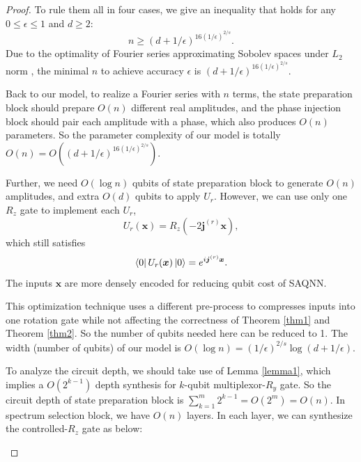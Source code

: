 \documentclass{article}
\theoremstyle{plain}
\theoremstyle{definition}
\theoremstyle{remark}
\begin{document}
\begin{proof}
    To rule them all in four cases, we give an inequality that holds for any $0\leq \epsilon \leq 1$ and $d\geq 2$:
    \begin{equation*}
        n \geq (d+1/\epsilon)^{16(1/\epsilon)^{2/s}}.
    \end{equation*}
    Due to the optimality of Fourier series approximating Sobolev spaces under $L_2$ norm \cite{pinkus2012}, the minimal $n$ to achieve accuracy $\epsilon$ is $(d+1/\epsilon)^{16(1/\epsilon)^{2/s}}$.

    Back to our model, to realize a Fourier series with $n$ terms, the state preparation block should prepare $O(n)$ different real amplitudes, and the phase injection block should pair each amplitude with a phase, which also produces $O(n)$ parameters. So the parameter complexity of our model is totally $O(n) = O((d+1/\epsilon)^{16(1/\epsilon)^{2/s}})$.  

    Further, we need $O(\log n)$ qubits of state preparation block to generate $O(n)$ amplitudes, and extra $O(d)$ qubits to apply $U_r$. However, we can use only one $R_z$ gate to implement each $U_r$,
    \begin{equation*}
        U_r(\boldsymbol{x}) = R_z(-2\boldsymbol{j}^{(r)}\boldsymbol{x}),
    \end{equation*}
    which still satisfies
    \begin{equation*}
        \bra{0}U_r (\boldsymbol{x})\ket{0} = e^{i\boldsymbol{j}^{(r)}\boldsymbol{x}}.
    \end{equation*}
    The inputs $\boldsymbol{x}$ are more densely encoded for reducing qubit cost of SAQNN.
    
    This optimization technique uses a different pre-process to compresses inputs into one rotation gate while not affecting the correctness of Theorem \ref{thm1} and Theorem \ref{thm2}. So the number of qubits needed here can be reduced to 1. The width (number of qubits) of our model is $O(\log n) = (1/\epsilon)^{2/s}\log(d+1/\epsilon)$.

    To analyze the circuit depth, we should take use of Lemma \ref{lemma1}, which implies a $O(2^{k-1})$ depth synthesis for $k$-qubit multiplexor-$R_y$ gate. So the circuit depth of state preparation block is $\sum_{k=1}^{m}2^{k-1}=O(2^m)=O(n)$. In spectrum selection block, we have $O(n)$ layers. In each layer, we can synthesize the controlled-$R_z$ gate as below: 
    \begin{center}
\end{center}
\end{proof}
\end{document}
